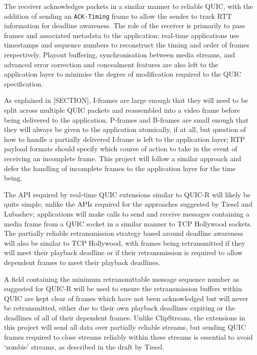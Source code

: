 \documentclass{mprop}
\begin{document}
The receiver acknowledges packets in a similar manner to reliable QUIC, with the addition of sending an \texttt{ACK-Timing} frame to allow the sender to track RTT information for deadline awareness. The role of the receiver is primarily to pass frames and associated metadata to the application; real-time applications use timestamps and sequence numbers to reconstruct the timing and order of frames respectively. Playout buffering, synchronisation between media streams, and advanced error correction and concealment features are also left to the application layer to minimise the degree of modification required to the QUIC specification.

As explained in [SECTION], I-frames are large enough that they will need to be split across multiple QUIC packets and reassembled into a video frame before being delivered to the application. P-frames and B-frames are small enough that they will always be given to the application atomically, if at all, but question of how to handle a partially delivered I-frame is left to the application layer; RTP payload formats should specify which course of action to take in the event of receiving an incomplete frame. This project will follow a similar approach and defer the handling of incomplete frames to the application layer for the time being.

The API required by real-time QUIC extensions similar to QUIC-R will likely be quite simple, unlike the APIs required for the approaches suggested by Tiesel and Lubashev; applications will make calls to send and receive messages containing a media frame from a QUIC socket in a similar manner to TCP Hollywood sockets. The partially reliable retransmission strategy based around deadline awareness will also be similar to TCP Hollywood, with frames being retransmitted if they will meet their playback deadline or if their retransmission is required to allow dependent frames to meet their playback deadlines.

A field containing the minimum retransmittable message sequence number as suggested for QUIC-R will be used to ensure the retransmission buffers within QUIC are kept clear of frames which have not been acknowledged but will never be retransmitted, either due to their own playback deadlines expiring or the deadlines of all of their dependent frames. Unlike ClipStream, the extensions in this project will send all data over partially reliable streams, but sending QUIC frames required to close streams reliably within these streams is essential to avoid `zombie' streams, as described in the draft by Tiesel.
\end{document}
